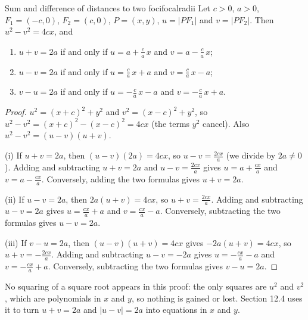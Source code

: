 \documentclass[11pt]{article}
\begin{document}
\begin{thm}{Sum and difference of distances to two foci}{focalradii}
Let $c>0$, $a>0$, $F_1=(-c,0)$, $F_2=(c,0)$, $P=(x,y)$, $u=\lvert PF_1\rvert$ and $v=\lvert PF_2\rvert$. Then $u^2-v^2=4cx$, and
\begin{enumerate}[label=(\roman*)]
  \item $u+v=2a$ if and only if $u=a+\frac ca\,x$ and $v=a-\frac ca\,x$;
  \item $u-v=2a$ if and only if $u=\frac ca\,x+a$ and $v=\frac ca\,x-a$;
  \item $v-u=2a$ if and only if $u=-\frac ca\,x-a$ and $v=-\frac ca\,x+a$.
\end{enumerate}
\end{thm}
\begin{proof}
$u^2=(x+c)^2+y^2$ and $v^2=(x-c)^2+y^2$, so $u^2-v^2=(x+c)^2-(x-c)^2=4cx$ (the terms $y^2$ cancel). Also $u^2-v^2=(u-v)(u+v)$.

(i) If $u+v=2a$, then $(u-v)(2a)=4cx$, so $u-v=\frac{2cx}a$ (we divide by $2a\ne0$). Adding and subtracting $u+v=2a$ and $u-v=\frac{2cx}a$ gives $u=a+\frac{cx}a$ and $v=a-\frac{cx}a$. Conversely, adding the two formulas gives $u+v=2a$.

(ii) If $u-v=2a$, then $2a(u+v)=4cx$, so $u+v=\frac{2cx}a$. Adding and subtracting $u-v=2a$ gives $u=\frac{cx}a+a$ and $v=\frac{cx}a-a$. Conversely, subtracting the two formulas gives $u-v=2a$.

(iii) If $v-u=2a$, then $(u-v)(u+v)=4cx$ gives $-2a(u+v)=4cx$, so $u+v=-\frac{2cx}a$. Adding and subtracting $u-v=-2a$ gives $u=-\frac{cx}a-a$ and $v=-\frac{cx}a+a$. Conversely, subtracting the two formulas gives $v-u=2a$.
\end{proof}

No squaring of a square root appears in this proof: the only squares are $u^2$ and $v^2$, which are polynomials in $x$ and $y$, so nothing is gained or lost. Section 12.4 uses it to turn $u+v=2a$ and $\lvert u-v\rvert=2a$ into equations in $x$ and $y$.
\end{document}
